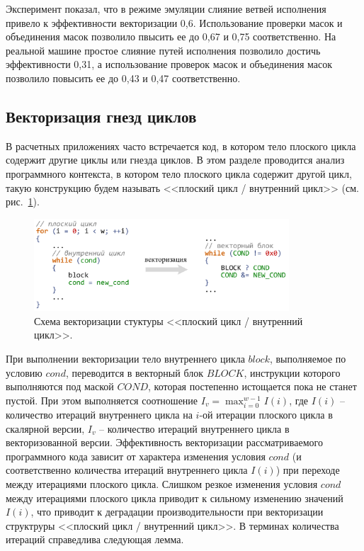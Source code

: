 Эксперимент показал, что в режиме эмуляции слияние ветвей исполнения привело к эффективности векторизации 0,6.
Использование проверки масок и объединения масок позволило пвысить ее до 0,67 и 0,75 соответственно.
На реальной машине простое слияние путей исполнения позволило достичь эффективности 0,31, а использование проверок масок и объединения масок позволило повысить ее до 0,43 и 0,47 соответственно.


\subsection{Векторизация гнезд циклов}

В расчетных приложениях часто встречается код, в котором тело плоского цикла содержит другие циклы или гнезда циклов.
В этом разделе проводится анализ программного контекста, в котором тело плоского цикла содержит другой цикл, такую конструкцию будем называть <<плоский цикл / внутренний цикл>> (см. рис.~\ref{fig:vec_flat_loop_nest}).

\begin{figure}[!ht]
\centering
\includegraphics[width=0.85\textwidth]{fig/vec_flat_loop_nest.pdf}
\singlespacing
\caption{Схема векторизации стуктуры <<плоский цикл / внутренний цикл>>.}
\label{fig:vec_flat_loop_nest}
\end{figure}

При выполнении векторизации тело внутреннего цикла $block$, выполняемое по условию $cond$, переводится в векторный блок $BLOCK$, инструкции которого выполняются под маской $COND$, которая постепенно истощается пока не станет пустой.
При этом выполняется соотношение $I_v = \max_{i = 0}^{w - 1}{I(i)}$, где $I(i)$ -- количество итераций внутреннего цикла на $i$-ой итерации плоского цикла в скалярной версии, $I_v$ -- количество итераций внутреннего цикла в векторизованной версии.
Эффективность векторизации рассматриваемого программного кода зависит от характера изменения условия $cond$ (и соответственно количества итераций внутреннего цикла $I(i)$) при переходе между итерациями плоского цикла.
Слишком резкое изменения условия $cond$ между итерациями плоского цикла приводит к сильному изменению значений $I(i)$, что приводит к деградации производительности при векторизации структруры <<плоский цикл / внутренний цикл>>.
В терминах количества итераций справедлива следующая лемма.

